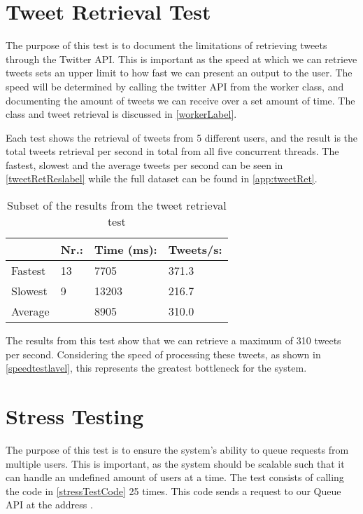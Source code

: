 \section{Tweet Retrieval Test}
The purpose of this test is to document the limitations of retrieving tweets
through the Twitter API. This is important as the speed at which we can retrieve
tweets sets an upper limit to how fast we can present an output to the user.
The speed will be determined by calling the twitter API from the worker class,
and documenting the amount of tweets we can receive over a set amount of time.
The  class and tweet retrieval is discussed in
\autoref{workerLabel}.\nl

Each test shows the retrieval of tweets from 5 different users, and the result
is the total tweets retrieval per second in total from all five concurrent
threads. The fastest, slowest and the average tweets per second can be seen in
\autoref{tweetRetReslabel} while the full dataset can be found in
\autoref{app:tweetRet}.

\begin{table}[H]\centering
\begin{tabular}{|l|l|l|l|}
\hline
\textbf{} & \textbf{Nr.:}	&	\textbf{Time (ms):}	&	\textbf{Tweets/s:} \\\hline
Fastest & 13	&	7705	&	371.3\\\hline
Slowest & 9	&	13203	&	216.7\\\hline
Average & 	&	8905	&	310.0 \\\hline
\end{tabular}
\caption{Subset of the results from the tweet retrieval test}
\label{tweetRetReslabel}
\end{table}

The results from this test show that we can retrieve a maximum of 310 tweets per
second. Considering the speed of processing these tweets, as shown in
\autoref{speedtestlavel}, this represents the greatest bottleneck for the
system.
 
\section{Stress Testing}
The purpose of this test is to ensure the system's ability to queue requests
from multiple users. This is important, as the system should be scalable such
that it can handle an undefined amount of users at a time. The test consists of
calling the code in \autoref{stressTestCode} 25 times. This code sends a request
to our Queue API at the address .\nl

